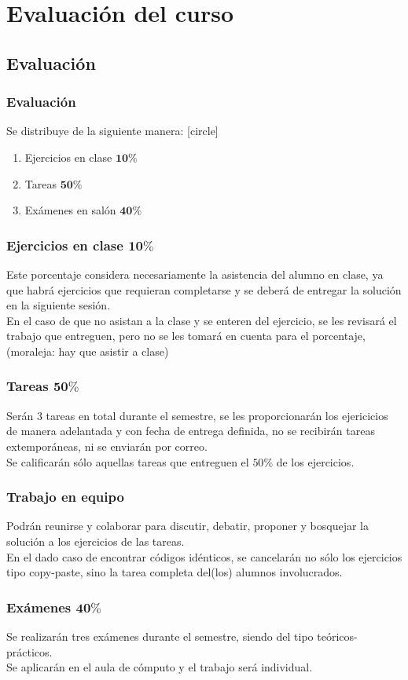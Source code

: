 \section{Evaluación del curso}
\subsection{Evaluación}
\begin{frame}
\frametitle{Evaluación}
Se distribuye de la siguiente manera:
[circle]
\begin{enumerate}[<+->]
\item Ejercicios en clase $\mathbf{10\%}$
\item Tareas $\mathbf{50\%}$
\item Exámenes en salón $\mathbf{40\%}$
\end{enumerate}
\end{frame}
\begin{frame}
\frametitle{Ejercicios en clase $\mathbf{10\%}$}
Este porcentaje considera necesariamente la asistencia del alumno en clase, ya que habrá ejercicios que requieran completarse y se deberá de entregar la solución en la siguiente sesión.
\\
\medskip
En el caso de que no asistan a la clase y se enteren del ejercicio, se les revisará el trabajo que entreguen, pero no se les tomará en cuenta para el porcentaje, (moraleja: hay que asistir a clase) 
\end{frame}
\begin{frame}
\frametitle{Tareas $\mathbf{50\%}$}
Serán 3 tareas en total durante el semestre, se les proporcionarán los ejericicios de manera adelantada y con fecha de entrega definida, no se recibirán tareas extemporáneas, ni se enviarán por correo.
\\
\bigskip
Se calificarán sólo aquellas tareas que entreguen el $50\%$ de los ejercicios. 
\end{frame}
\begin{frame}
\frametitle{Trabajo en equipo}
Podrán reunirse y colaborar para discutir, debatir, proponer y bosquejar la solución a los ejercicios de las tareas.
\\
\bigskip
En el dado caso de encontrar códigos idénticos, se cancelarán no sólo los ejercicios tipo copy-paste, sino la tarea completa del(los) alumnos involucrados.
\end{frame}
\begin{frame}
\frametitle{Exámenes $\mathbf{40\%}$}
Se realizarán tres exámenes durante el semestre, siendo del tipo teóricos-prácticos.
\\
\bigskip
Se aplicarán en el aula de cómputo y el trabajo será individual.
\end{frame}
